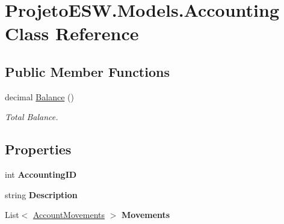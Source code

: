 \hypertarget{class_projeto_e_s_w_1_1_models_1_1_accounting}{}\section{Projeto\+E\+S\+W.\+Models.\+Accounting Class Reference}
\label{class_projeto_e_s_w_1_1_models_1_1_accounting}
\subsection*{Public Member Functions}
\begin{DoxyCompactItemize}
\item 
decimal \mbox{\hyperlink{class_projeto_e_s_w_1_1_models_1_1_accounting_ad5a95a7e8c35b6c76536606b50f8e7a2}{Balance}} ()
\begin{DoxyCompactList}\small\item\em Total Balance.\end{DoxyCompactList}\end{DoxyCompactItemize}
\subsection*{Properties}
\begin{DoxyCompactItemize}
\item 
\mbox{\label{class_projeto_e_s_w_1_1_models_1_1_accounting_af7917618842b6b064cf7789d9cb5701d}} 
int {\bfseries Accounting\+ID}
\item 
\mbox{\label{class_projeto_e_s_w_1_1_models_1_1_accounting_a81f6d8784d4704db1be1765dacc26237}} 
string {\bfseries Description}
\item 
\mbox{\label{class_projeto_e_s_w_1_1_models_1_1_accounting_a3b50b5f7dc6d81df7fd264ea73c4f218}} 
List$<$ \mbox{\hyperlink{class_projeto_e_s_w_1_1_models_1_1_account_movements}{Account\+Movements}} $>$ {\bfseries Movements}
\end{DoxyCompactItemize}


